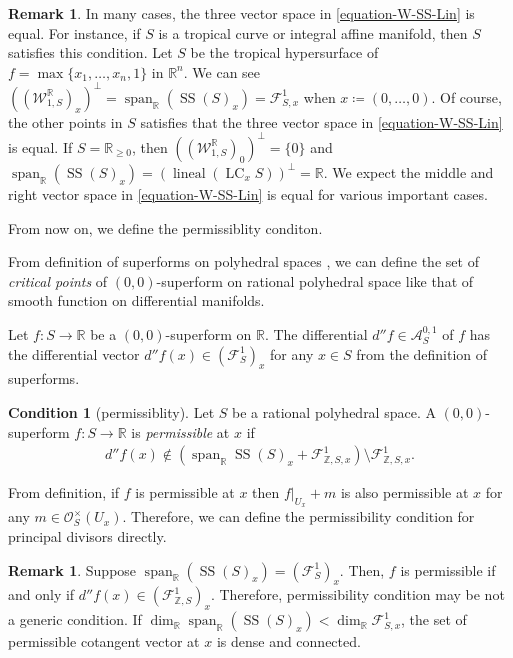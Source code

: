 \documentclass[a4paper,dvipdfmx,reqno,12pt]{amsart}
\theoremstyle{definition}
\newtheorem{remark}[theorem]{Remark}
\newtheorem{condition}[theorem]{Condition}
\newcommand{\deq}{\coloneqq}
\newcommand{\opn}[1]{\operatorname{#1}}
\numberwithin{equation}{section}
\begin{document}
\begin{remark}
In many cases, the three vector space in 
\cref{equation-W-SS-Lin} is equal.
For instance, if $S$ is a tropical curve 
or integral affine manifold, 
then $S$ satisfies this condition.
Let $S$ be the tropical hypersurface of
$f=\max\{x_1,\ldots,x_n,1\}$ in $\mathbb{R}^{n}$. 
We can see
$((\mathcal{W}_{1,S}^{\mathbb{R}})_{x})^{\bot}=\opn{span}_{{\mathbb{R}}}(\opn{SS}(S)_x)=\mathcal{F}_{S,x}^{1}$
when $x\deq (0,\ldots,0)$. 
Of course, the other points in $S$ satisfies 
that the three vector space in 
\cref{equation-W-SS-Lin} is equal. If 
$S=\mathbb{R}_{\geq 0}$, then 
$((\mathcal{W}_{1,S}^{\mathbb{R}})_{0})^{\bot}=\{0\}$ and
$\opn{span}_{\mathbb{R}}(\opn{SS}(S)_x)=
(\opn{lineal}(\opn{LC}_x S))^{\bot}=\mathbb{R}$. 
We expect the middle and right vector space in 
\cref{equation-W-SS-Lin} is equal for various 
important cases.
\end{remark}

From now on, we define the permissiblity conditon.

From definition of superforms on 
polyhedral spaces 
\cite[Definition 2.10, 2.24]{MR3903579}, we 
can define the set of \emph{critical points} 
of $(0,0)$-superform on rational polyhedral space
like that of smooth function on differential
manifolds.


Let $f\colon S \to \mathbb{R}$ be a $(0,0)$-superform on 
$\mathbb{R}$. The differential $d''f\in \mathcal{A}^{0,1}_S$ of $f$ has the 
differential vector $d''f (x)\in (\mathcal{F}_{S}^{1})_x$ for any 
$x\in S$ from the definition of superforms.

\begin{condition}[{permissiblity}] \label{cond: permissible}
Let $S$ be a rational polyhedral space.
A $(0,0)$-superform $f\colon S \to {\mathbb{R}}$ is \emph{permissible} at $x$ 
if 
\begin{align}
d''f(x)\notin (\opn{span}_{{\mathbb{R}}}
\opn{SS}(S)_x+\mathcal{F}_{\mathbb{Z},S,x}^{1})
\setminus \mathcal{F}_{\mathbb{Z},S,x}^{1}.
\end{align}
\end{condition}

From definition, if $f$ is permissible at $x$ then
$f|_{U_x}+m$ is also permissible at $x$ for any 
$m\in \mathcal{O}_{S}^{\times}(U_x)$.
Therefore, we can define the permissibility condition
for principal divisors directly.
\begin{remark}
Suppose $\opn{span}_{\mathbb{R}}(\opn{SS}(S)_x)=(\mathcal{F}_{S}^{1})_x$. 
Then, $f$ is permissible if and only if 
$d''f(x)\in (\mathcal{F}_{\mathbb{Z},S}^{1})_x$.
Therefore, permissibility
condition may be not a generic condition.
If $\dim_{\mathbb{R}} \opn{span}_{{\mathbb{R}}}
(\opn{SS}(S)_x)<\dim_{\mathbb{R}} \mathcal{F}_{S,x}^{1}$, the 
set of permissible cotangent vector at $x$ is dense and 
connected.
\end{remark}
\end{document}
